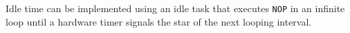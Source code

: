 


Idle time can be implemented using an idle task that executes \texttt{NOP} in an
infinite loop until a hardware timer signals the star of the next looping
interval. 
